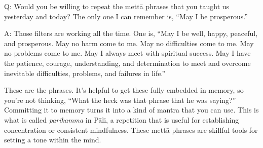 \vspace{\the\qaskip}
Q: Would you be willing to repeat the mettā phrases that you taught us
yesterday and today? The only one I can remember is, “May I be
prosperous.”

\vspace{\the\qaskip}
A: Those filters are working all the time. One is, “May I be well,
happy, peaceful, and prosperous. May no harm come to me. May no
difficulties come to me. May no problems come to me. May I always meet
with spiritual success. May I have the patience, courage, understanding,
and determination to meet and overcome inevitable difficulties,
problems, and failures in life.”

These are the phrases. It’s helpful to get these fully embedded in
memory, so you’re not thinking, “What the heck was that phrase that he
was saying?” Committing it to memory turns it into a kind of mantra that
you can use. This is what is called \emph{parikamma} in Pāli, a
repetition that is useful for establishing concentration or consistent
mindfulness. These mettā phrases are skillful tools for setting a tone
within the mind.
